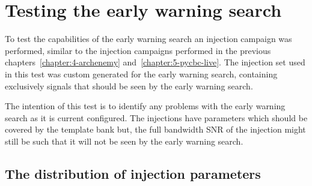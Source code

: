 \section{\label{6:sec:injection-tests}Testing the early warning search}

To test the capabilities of the early warning search an injection campaign was performed, similar to the injection campaigns performed in the previous chapters~\ref{chapter:4-archenemy} and~\ref{chapter:5-pycbc-live}. The injection set used in this test was custom generated for the early warning search, containing exclusively signals that should be seen by the early warning search.

The intention of this test is to identify any problems with the early warning search as it is current configured. The injections have parameters which should be covered by the template bank but, the full bandwidth SNR of the injection might still be such that it will not be seen by the early warning search.

\subsection{\label{6:sec:injection-set}The distribution of injection parameters}

